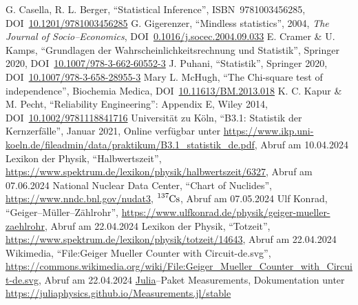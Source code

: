 \documentclass[12pt,a4paper]{scrartcl}
\numberwithin{equation}{section} %
\newcommand{\code}[1]{\textsf{#1}}
\begin{document}
\begin{thebibliography}{99}
	G. Casella, R. L. Berger, ``Statistical Inference'', ISBN~9781003456285,
	DOI~\href{https://doi.org/10.1201/9781003456285}{10.1201/9781003456285}
	G. Gigerenzer, ``Mindless statistics'', 2004, \emph{The Journal of
		Socio--Economics},
		DOI~\href{https://doi.org/10.1016/j.socec.2004.09.033}{0.1016/j.socec.2004.09.033}
	E. Cramer \& U. Kamps, ``Grundlagen der Wahrscheinlichkeitsrechnung
	und Statistik'', Springer 2020, DOI~\href{https://doi.org/10.1007/978-3-662-60552-3}{10.1007/978-3-662-60552-3}
	J. Puhani, ``Statistik'', Springer 2020, DOI~\href{https://doi.org/10.1007/978-3-658-28955-3}{10.1007/978-3-658-28955-3}
	Mary L. McHugh, ``The Chi-square test of independence'', Biochemia Medica, DOI~\href{https://doi.org/10.11613/BM.2013.018}{10.11613/BM.2013.018}
	K. C. Kapur \& M. Pecht, ``Reliability Engineering'': Appendix E,
	Wiley 2014,
	DOI~\href{https://doi.org/10.1002/9781118841716}{10.1002/9781118841716}
	Universität zu Köln, ``B3.1: Statistik der Kernzerfälle'', Januar
	2021, Online verfügbar unter
	\url{https://www.ikp.uni-koeln.de/fileadmin/data/praktikum/B3.1_statistik_de.pdf}, Abruf am 10.04.2024
	Lexikon der Physik, ``Halbwertszeit'', \url{https://www.spektrum.de/lexikon/physik/halbwertszeit/6327}, Abruf am 07.06.2024
	National Nuclear Data Center, ``Chart of Nuclides'',
	\url{https://www.nndc.bnl.gov/nudat3}, $\ce{^{137}Cs}$,
	Abruf am 07.05.2024
	Ulf Konrad, ``Geiger--Müller--Zählrohr'', \url{https://www.ulfkonrad.de/physik/geiger-mueller-zaehlrohr}, Abruf am 22.04.2024
	Lexikon der Physik, ``Totzeit'', \url{https://www.spektrum.de/lexikon/physik/totzeit/14643}, Abruf am 22.04.2024
	Wikimedia, ``File:Geiger Mueller Counter with Circuit-de.svg'', \url{https://commons.wikimedia.org/wiki/File:Geiger_Mueller_Counter_with_Circuit-de.svg}, Abruf am 22.04.2024
	\code{\href{https://julialang.org}{Julia}}--Paket \code{Measurements}, Dokumentation unter \url{https://juliaphysics.github.io/Measurements.jl/stable}
\end{thebibliography}
\end{document}
